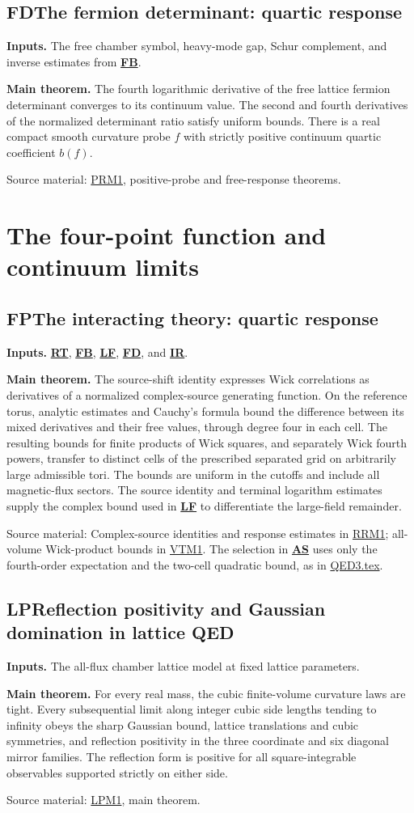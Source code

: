 \documentclass[11pt]{article}
\newcommand{\Code}[1]{\hyperlink{block-#1}{\textbf{#1}}}
\newcommand{\Block}[2]{\hypertarget{block-#1}{}%
 \subsection*{\textcolor{flowgreen}{#1}\quad #2}}
\newcommand{\Inputs}[1]{\textbf{Inputs.} #1\par}
\newcommand{\Theorem}[1]{\textbf{Main theorem.} #1\par}
\newcommand{\Sources}[1]{\par{\small\textcolor{flowgray}{Source material:} #1\par}}
\newcommand{\Repo}{https://github.com/ethanwsussman/Yang--Mills-LLM-experiment}
\newcommand{\Old}[2]{\href{\Repo/#1}{#2}}
\newcommand{\RRsource}{\Old{tree/main/QED3/OLD/Submanuscripts/Reference\%20response\%20\%28RR1\%29}{RRM1}}
\newcommand{\PRsource}{\Old{tree/main/QED3/OLD/Submanuscripts/Positive\%20probes\%20and\%20free\%20response\%20\%28PR1\%29}{PRM1}}
\newcommand{\VTsource}{\Old{tree/main/QED3/OLD/Submanuscripts/Volume\%20transfer\%20\%28VT1\%29}{VTM1}}
\newcommand{\LPsource}{\Old{tree/main/QED3/OLD/Submanuscripts/Infinite-lattice\%20reflection\%20positivity\%20\%28LP1\%29}{LPM1}}
\newcommand{\CurrentQEsource}{\Old{blob/main/QED3/QED3.tex}{QED3.tex}}
\begin{document}
\Block{FD}{The fermion determinant: quartic response}
\Inputs{The free chamber symbol, heavy-mode gap, Schur complement,
and inverse estimates from \Code{FB}.}
\Theorem{The fourth logarithmic derivative of the free lattice fermion
determinant converges to its continuum value. The second and fourth
derivatives of the normalized determinant ratio satisfy uniform bounds.
There is a real compact smooth curvature probe \(f\) with strictly
positive continuum quartic coefficient \(b(f)\).}
\Sources{\PRsource, positive-probe and free-response theorems.}

\clearpage
\section*{The four-point function and continuum limits}

\Block{FP}{The interacting theory: quartic response}
\Inputs{\Code{RT}, \Code{FB}, \Code{LF}, \Code{FD}, and \Code{IR}.}
\Theorem{The source-shift identity expresses Wick correlations as
derivatives of a normalized complex-source generating function.
On the reference torus, analytic estimates and Cauchy's formula bound
the difference between its mixed derivatives and their free values,
through degree four in each cell. The resulting bounds for finite
products of Wick squares,
and separately Wick fourth powers, transfer to distinct cells of the
prescribed separated grid on arbitrarily large admissible tori.
The bounds are uniform in the cutoffs and include all magnetic-flux
sectors. The source identity and terminal logarithm estimates supply
the complex bound used in \Code{LF} to differentiate the large-field
remainder.}
\Sources{Complex-source identities and response estimates in \RRsource;
all-volume Wick-product bounds in \VTsource.
The selection in \Code{AS} uses only the fourth-order expectation and
the two-cell quadratic bound, as in \CurrentQEsource.}

\Block{LP}{Reflection positivity and Gaussian domination in lattice QED}
\Inputs{The all-flux chamber lattice model at fixed lattice parameters.}
\Theorem{For every real mass, the cubic finite-volume curvature laws
are tight. Every subsequential limit along integer cubic side lengths
tending to infinity obeys the sharp Gaussian bound, lattice translations
and cubic symmetries, and reflection positivity in the three coordinate
and six diagonal mirror families. The reflection form is positive for
all square-integrable observables supported strictly on either side.}
\Sources{\LPsource, main theorem.}
\end{document}

